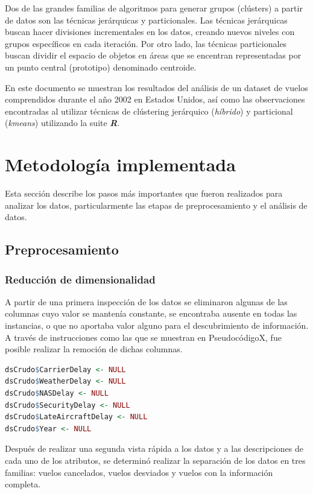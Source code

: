 \documentclass[12pt]{article}
\numberwithin{equation}{section}
\numberwithin{table}{section}
\numberwithin{figure}{section}
\begin{document}
Dos de las grandes familias de algoritmos para generar grupos (clústers) a partir de datos son las técnicas jerárquicas y particionales. 
Las técnicas jerárquicas buscan hacer divisiones incrementales en los datos, creando nuevos niveles con grupos específicos en cada iteración.
Por otro lado, las técnicas particionales buscan dividir el espacio de objetos en áreas que se encentran representadas por un punto central (prototipo) denominado centroide.

En este documento se muestran los resultados del análisis de un dataset de vuelos comprendidos durante el año 2002 en Estados Unidos, así como las observaciones encontradas al utilizar técnicas de clústering jerárquico (\emph{híbrido}) y particional (\emph{kmeans}) utilizando la suite \emph{\textbf{R}}.

\section{Metodología implementada}
Esta sección describe los pasos más importantes que fueron realizados para analizar los datos, particularmente las etapas de preprocesamiento y el análisis de datos.

\subsection{Preprocesamiento}
\subsubsection{Reducción de dimensionalidad}
A partir de una primera inspección de los datos se eliminaron algunas de las columnas cuyo valor se mantenía constante, se encontraba ausente en todas las instancias, o que no aportaba valor alguno para el descubrimiento de información. 
A través de instrucciones como las que se muestran en PseudocódigoX, fue posible realizar la remoción de dichas columnas.

\begin{lstlisting}[language=R, caption=Eliminación de columnas con valores constantes]
dsCrudo$CarrierDelay <- NULL
dsCrudo$WeatherDelay <- NULL
dsCrudo$NASDelay <- NULL
dsCrudo$SecurityDelay <- NULL
dsCrudo$LateAircraftDelay <- NULL
dsCrudo$Year <- NULL
\end{lstlisting}


Después de realizar una segunda vista rápida a los datos y a las descripciones de cada uno de los atributos, se determinó realizar la separación de los datos en tres familias: vuelos cancelados, vuelos desviados y vuelos con la información completa.
\end{document}

